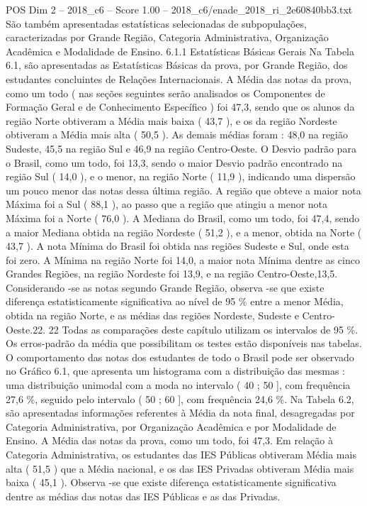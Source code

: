 \begin{textsample}{POS Dim 2 – 2018\_c6 – Score 1.00 – 2018\_c6/enade\_2018\_ri\_2e60840bb3.txt}
São também apresentadas estatísticas selecionadas de subpopulações, caracterizadas por Grande Região, Categoria Administrativa, Organização Acadêmica e Modalidade de Ensino. 6.1.1 Estatísticas Básicas Gerais Na Tabela 6.1, são apresentadas as Estatísticas Básicas da prova, por Grande Região, dos estudantes concluintes de Relações Internacionais.
A Média das notas da prova, como um todo ( nas seções seguintes serão analisados os Componentes de Formação Geral e de Conhecimento Específico ) foi 47,3, sendo que os alunos da região Norte obtiveram a Média mais baixa ( 43,7 ), e os da região Nordeste obtiveram a Média mais alta ( 50,5 ).
As demais médias foram : 48,0 na região Sudeste, 45,5 na região Sul e 46,9 na região Centro-Oeste.
O Desvio padrão para o Brasil, como um todo, foi 13,3, sendo o maior Desvio padrão encontrado na região Sul ( 14,0 ), e o menor, na região Norte ( 11,9 ), indicando uma dispersão um pouco menor das notas dessa última região.
A região que obteve a maior nota Máxima foi a Sul ( 88,1 ), ao passo que a região que atingiu a menor nota Máxima foi a Norte ( 76,0 ).
A Mediana do Brasil, como um todo, foi 47,4, sendo a maior Mediana obtida na região Nordeste ( 51,2 ), e a menor, obtida na Norte ( 43,7 ).
A nota Mínima do Brasil foi obtida nas regiões Sudeste e Sul, onde esta foi zero.
A Mínima na região Norte foi 14,0, a maior nota Mínima dentre as cinco Grandes Regiões, na região Nordeste foi 13,9, e na região Centro-Oeste,13,5.
Considerando -se as notas segundo Grande Região, observa -se que existe diferença estatisticamente significativa ao nível de 95 \% entre a menor Média, obtida na região Norte, e as médias das regiões Nordeste, Sudeste e Centro-Oeste.22. 22 Todas as comparações deste capítulo utilizam os intervalos de 95 \%.
Os erros-padrão da média que possibilitam os testes estão disponíveis nas tabelas.
O comportamento das notas dos estudantes de todo o Brasil pode ser observado no Gráfico 6.1, que apresenta um histograma com a distribuição das mesmas : uma distribuição unimodal com a moda no intervalo ( 40 ; 50 ], com frequência 27,6 \%, seguido pelo intervalo ( 50 ; 60 ], com frequência 24,6 \%.
Na Tabela 6.2, são apresentadas informações referentes à Média da nota final, desagregadas por Categoria Administrativa, por Organização Acadêmica e por Modalidade de Ensino.
A Média das notas da prova, como um todo, foi 47,3.
Em relação à Categoria Administrativa, os estudantes das IES Públicas obtiveram Média mais alta ( 51,5 ) que a Média nacional, e os das IES Privadas obtiveram Média mais baixa ( 45,1 ).
Observa -se que existe diferença estatisticamente significativa dentre as médias das notas das IES Públicas e as das Privadas.

\end{textsample}
